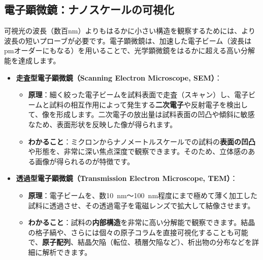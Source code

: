 \documentclass[11pt,a4paper]{ltjsarticle}
\begin{document}
\subsection{電子顕微鏡：ナノスケールの可視化}
可視光の波長（数百\si{\nano\meter}）よりもはるかに小さい構造を観察するためには、より波長の短いプローブが必要です。電子顕微鏡は、加速した電子ビーム（波長はpmオーダーにもなる）を用いることで、光学顕微鏡をはるかに超える高い分解能を達成します\cite{ref1}。
\begin{itemize}
    \item \textbf{走査型電子顕微鏡（Scanning Electron Microscope, SEM）}：
    \begin{itemize}
        \item \textbf{原理}：細く絞った電子ビームを試料表面で走査（スキャン）し、電子ビームと試料の相互作用によって発生する\textbf{二次電子}や反射電子を検出して、像を形成します\cite{ref1}。二次電子の放出量は試料表面の凹凸や傾斜に敏感なため、表面形状を反映した像が得られます。
        \item \textbf{わかること}：ミクロンからナノメートルスケールでの試料の\textbf{表面の凹凸}や形態を、非常に深い焦点深度で観察できます。そのため、立体感のある画像が得られるのが特徴です\cite{ref1}。
    \end{itemize}
    \item \textbf{透過型電子顕微鏡（Transmission Electron Microscope, TEM）}：
    \begin{itemize}
        \item \textbf{原理}：電子ビームを、数\SI{10}{\nano\meter}～\SI{100}{\nano\meter}程度にまで極めて薄く加工した試料に透過させ、その透過電子を電磁レンズで拡大して結像させます\cite{ref1}。
        \item \textbf{わかること}：試料の\textbf{内部構造}を非常に高い分解能で観察できます。結晶の格子縞や、さらには個々の原子コラムを直接可視化することも可能で、\textbf{原子配列}、結晶欠陥（転位、積層欠陥など）、析出物の分布などを詳細に解析できます\cite{ref1}。
    \end{itemize}
\end{itemize}
\end{document}
